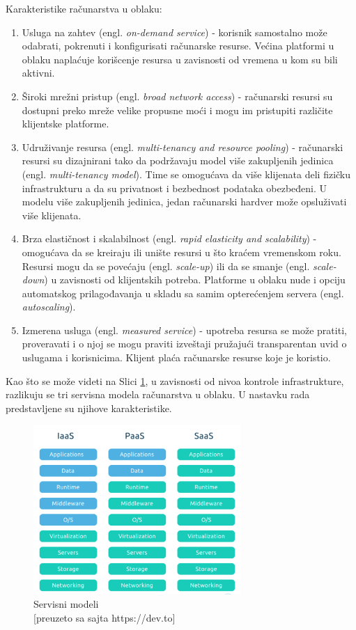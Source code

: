 \documentclass[12pt,oneside]{memoir}
\begin{document}
Karakteristike računarstva u oblaku:
\begin{enumerate}
  \item Usluga na zahtev (engl. \emph{on-demand service}) - korisnik samostalno može odabrati, pokrenuti i konfigurisati računarske resurse. Većina platformi u oblaku naplaćuje korišcenje resursa u zavisnosti od vremena u kom su bili aktivni.
  \item Široki mrežni pristup (engl. \emph{broad network access}) - računarski resursi su dostupni preko mreže velike propusne moći i mogu im pristupiti različite klijentske platforme.
  \item Udruživanje resursa (engl. \emph{multi-tenancy and resource pooling}) - računarski resursi su dizajnirani tako da podržavaju model više zakupljenih jedinica (engl. \emph{multi-tenancy model}). Time se omogućava da više klijenata deli fizičku infrastrukturu a da su privatnost i bezbednost podataka obezbeđeni. U modelu više zakupljenih jedinica, jedan računarski hardver može opsluživati više klijenata.
  \item Brza elastičnost i skalabilnost (engl. \emph{rapid elasticity and scalability}) - omogućava da se kreiraju ili unište resursi u što kraćem vremenskom roku. Resursi mogu da se povećaju (engl. \emph{scale-up}) ili da se smanje (engl. \emph{scale-down}) u zavisnosti od klijentskih potreba. Platforme u oblaku nude i opciju automatskog prilagođavanja u skladu sa samim opterećenjem servera (engl. \emph{autoscaling}).
  \item Izmerena usluga (engl. \emph{measured service}) - upotreba resursa se može pratiti, proveravati i o njoj se mogu praviti izveštaji pružajući transparentan uvid o uslugama i korisnicima. Klijent plaća računarske resurse koje je koristio.
\end{enumerate}

Kao što se može videti na Slici \ref{fig:servisniModeli}, u zavisnosti od nivoa kontrole infrastrukture, razlikuju se tri servisna modela računarstva u oblaku. U nastavku rada predstavljene su njihove karakteristike.

\begin{figure}[!ht]
  \centering
  \includegraphics[width=0.7\textwidth]{Slika 5.png}
  \caption{Servisni modeli\\\footnotesize[preuzeto sa sajta https://dev.to]}
  \label{fig:servisniModeli}
\end{figure}
 
\end{document}

